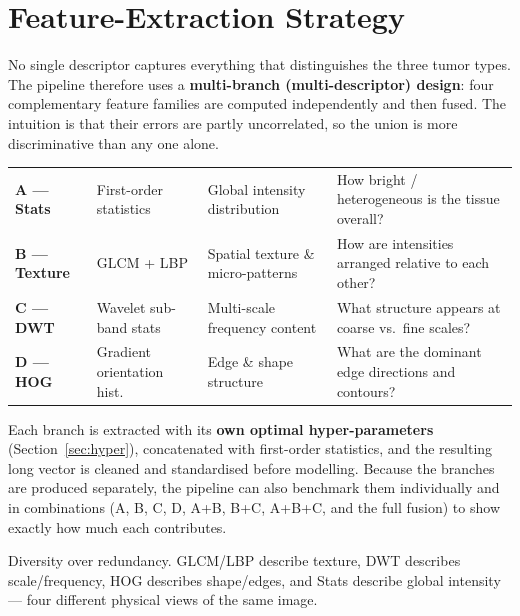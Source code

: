 \section{Feature-Extraction Strategy}

No single descriptor captures everything that distinguishes the three tumor types. The pipeline
therefore uses a \textbf{multi-branch (multi-descriptor) design}: four complementary feature families
are computed independently and then fused. The intuition is that their errors are partly
uncorrelated, so the union is more discriminative than any one alone.

\begin{center}
\renewcommand{\arraystretch}{1.25}
\begin{tabularx}{\textwidth}{@{}l l Y Y@{}}
\toprule
{} &  &  &  \\
\midrule
\textbf{A --- Stats}   & First-order statistics       & Global intensity distribution   & How bright / heterogeneous is the tissue overall? \\
\textbf{B --- Texture} & GLCM + LBP                   & Spatial texture \& micro-patterns & How are intensities arranged relative to each other? \\
\textbf{C --- DWT}     & Wavelet sub-band stats       & Multi-scale frequency content   & What structure appears at coarse vs.\ fine scales? \\
\textbf{D --- HOG}     & Gradient orientation hist.   & Edge \& shape structure         & What are the dominant edge directions and contours? \\
\bottomrule
\end{tabularx}
\renewcommand{\arraystretch}{1.0}
\end{center}

Each branch is extracted with its \textbf{own optimal hyper-parameters} (Section~\ref{sec:hyper}),
concatenated with first-order statistics, and the resulting long vector is cleaned and standardised
before modelling. Because the branches are produced separately, the pipeline can also benchmark them
individually and in combinations (A, B, C, D, A+B, B+C, A+B+C, and the full fusion) to show exactly
how much each contributes.

\begin{notebox}
Diversity over redundancy. GLCM/LBP describe texture, DWT describes scale/frequency, HOG describes
shape/edges, and Stats describe global intensity --- four different physical views of the same image.
\end{notebox}
